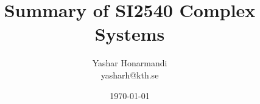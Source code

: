 \documentclass[a4paper, 11pt]{article}
\title{Summary of SI2540 Complex Systems}
\author{Yashar Honarmandi \\ yasharh@kth.se}
\date{\today}
\begin{document}
\maketitle

\begin{abstract}
	
\end{abstract}

\thispagestyle{empty}

\newpage

\tableofcontents

\newpage

\end{document}
